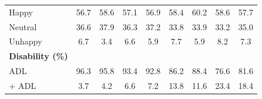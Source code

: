\documentclass[12pt, a4paper]{article}
\begin{document}
\begin{appendices}
\begin{table}[!h]
{\begin{tabular}{lcccccccc}
        \quad Happy        & 56.7                                & 58.6                                & 57.1                                & 56.9                                & 58.4              & 60.2              & 58.6              & 57.7              \\
        \quad Neutral      & 36.6                                & 37.9                                & 36.3                                & 37.2                                & 33.8              & 33.9              & 33.2              & 35.0              \\
        \quad Unhappy      & 6.7                                 & 3.4                                 & 6.6                                 & 5.9                                 & 7.7               & 5.9               & 8.2               & 7.3               \\
        \midrule
        \textbf{Disability (\%)}                                                                                                                                                                                                                                   \\
        \quad 0 ADL        & 96.3                                & 95.8                                & 93.4                                & 92.8                                & 86.2              & 88.4              & 76.6              & 81.6              \\
        \quad 1+ ADL       & 3.7                                 & 4.2                                 & 6.6                                 & 7.2                                 & 13.8              & 11.6              & 23.4              & 18.4              \\
        \bottomrule
      \end{tabular}%
    }
  \end{table}
  \vspace*{\fill}


\end{appendices}
\end{document}
